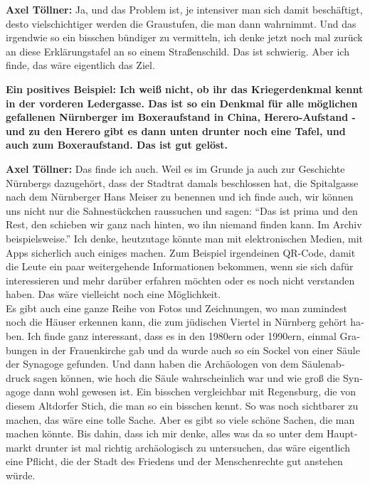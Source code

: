 \begin{otherlanguage}{ngerman}
\textbf{Axel Töllner:} Ja, und das Problem ist, je intensiver man sich damit beschäftigt, desto vielschichtiger werden die Graustufen, die man dann wahrnimmt. Und das irgendwie so ein bisschen bündiger zu vermitteln, ich denke jetzt noch mal zurück an diese Erklärungstafel an so einem Straßenschild. Das ist schwierig. Aber ich finde, das wäre eigentlich das Ziel. 

\textbf{Ein positives Beispiel: Ich weiß nicht, ob ihr das Kriegerdenkmal kennt in der vorderen Ledergasse. Das ist so ein Denkmal für alle möglichen gefallenen Nürnberger im Boxeraufstand in China, Herero-Aufstand - und zu den Herero gibt es dann unten drunter noch eine Tafel, und auch zum Boxeraufstand. Das ist gut gelöst.} 

\textbf{Axel Töllner:} Das finde ich auch. Weil es im Grunde ja auch zur Geschichte Nürnbergs dazugehört, dass der Stadtrat damals beschlossen hat, die Spitalgasse nach dem Nürnberger Hans Meiser zu benennen und ich finde auch, wir können uns nicht nur die Sahnestückchen raussuchen und sagen: "`Das ist prima und den Rest, den schieben wir ganz nach hinten, wo ihn niemand finden kann. Im Archiv beispielsweise."' Ich denke, heutzutage könnte man mit elektronischen Medien, mit Apps sicherlich auch einiges machen. Zum Beispiel irgendeinen QR-Code, damit die Leute ein paar weitergehende Informationen bekommen, wenn sie sich dafür interessieren und mehr darüber erfahren möchten oder es noch nicht verstanden haben. Das wäre vielleicht noch eine Möglichkeit. \\
Es gibt auch eine ganze Reihe von Fotos und Zeichnungen, wo man zumindest noch die Häuser erkennen kann, die zum jüdischen Viertel in Nürnberg gehört haben. Ich finde ganz interessant, dass es in den 1980ern oder 1990ern, einmal Grabungen in der Frauenkirche gab und da wurde auch so ein Sockel von einer Säule der Synagoge gefunden. Und dann haben die Archäologen von dem Säulenabdruck sagen können, wie hoch die Säule wahrscheinlich war und wie groß die Synagoge dann wohl gewesen ist. Ein bisschen vergleichbar mit Regensburg, die von diesem Altdorfer Stich, die man so ein bisschen kennt. So was noch sichtbarer zu machen, das wäre eine tolle Sache. Aber es gibt so viele schöne Sachen, die man machen könnte. Bis dahin, dass ich mir denke, alles was da so unter dem Hauptmarkt drunter ist mal richtig archäologisch zu untersuchen, das wäre eigentlich eine Pflicht, die der Stadt des Friedens und der Menschenrechte gut anstehen würde. 
\end{otherlanguage}